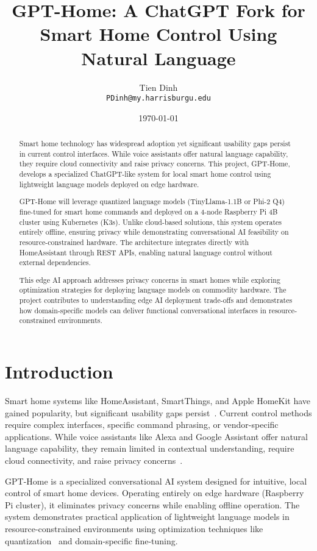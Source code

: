 \documentclass[12pt]{article}
\title{GPT-Home: A ChatGPT Fork for Smart Home Control Using Natural Language}
\author{Tien Dinh\\\texttt{PDinh@my.harrisburgu.edu}}
\date{\today}
\begin{document}
\maketitle

\begin{abstract}
Smart home technology has widespread adoption yet significant usability gaps persist in current control interfaces. While voice assistants offer natural language capability, they require cloud connectivity and raise privacy concerns. This project, GPT-Home, develops a specialized ChatGPT-like system for local smart home control using lightweight language models deployed on edge hardware.

GPT-Home will leverage quantized language models (TinyLlama-1.1B or Phi-2 Q4) fine-tuned for smart home commands and deployed on a 4-node Raspberry Pi 4B cluster using Kubernetes (K3s). Unlike cloud-based solutions, this system operates entirely offline, ensuring privacy while demonstrating conversational AI feasibility on resource-constrained hardware. The architecture integrates directly with HomeAssistant through REST APIs, enabling natural language control without external dependencies.

This edge AI approach addresses privacy concerns in smart homes while exploring optimization strategies for deploying language models on commodity hardware. The project contributes to understanding edge AI deployment trade-offs and demonstrates how domain-specific models can deliver functional conversational interfaces in resource-constrained environments.
\end{abstract}

\section{Introduction}

Smart home systems like HomeAssistant, SmartThings, and Apple HomeKit have gained popularity, but significant usability gaps persist~\cite{yang2019smart}. Current control methods require complex interfaces, specific command phrasing, or vendor-specific applications. While voice assistants like Alexa and Google Assistant offer natural language capability, they remain limited in contextual understanding, require cloud connectivity, and raise privacy concerns~\cite{wilson2020privacy}.

GPT-Home is a specialized conversational AI system designed for intuitive, local control of smart home devices. Operating entirely on edge hardware (Raspberry Pi cluster), it eliminates privacy concerns while enabling offline operation. The system demonstrates practical application of lightweight language models in resource-constrained environments using optimization techniques like quantization~\cite{jacob2018quantization} and domain-specific fine-tuning.
\end{document}
